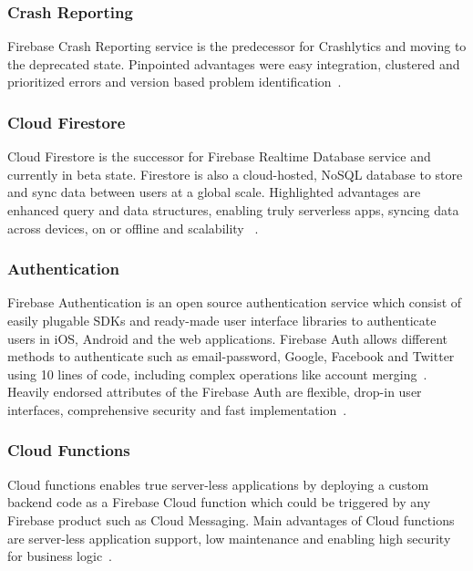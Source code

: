\subsubsection{Crash Reporting} Firebase Crash Reporting service is the
predecessor for Crashlytics and moving to the deprecated state. Pinpointed
advantages were easy integration, clustered and prioritized errors and version
based problem identification~\cite{hid-sp18-409-www-firebase-products}.

\subsubsection{Cloud Firestore} Cloud Firestore is the successor for Firebase
Realtime Database service and currently in beta state. Firestore is also a
cloud-hosted, NoSQL database to store and sync data between users at a global
scale. Highlighted advantages are enhanced query and data structures, enabling
truly serverless apps,  syncing data across devices, on or offline and
scalability ~\cite{hid-sp18-409-www-firebase-official,
	hid-sp18-409-www-firebase-products}.

\subsubsection{Authentication} Firebase Authentication is an open source
authentication service which consist of easily plugable SDKs and ready-made user
interface libraries to authenticate users in iOS, Android and the web
applications. Firebase Auth allows different methods to authenticate such as
email-password, Google, Facebook and Twitter using 10 lines of code, including
complex operations like account
merging~\cite{hid-sp18-409-www-firebase-products}. Heavily endorsed attributes
of the Firebase Auth are flexible, drop-in user interfaces, comprehensive
security and fast implementation~\cite{hid-sp18-409-www-firebase-wikipedia}.

\subsubsection{Cloud Functions} Cloud functions enables true server-less
applications by deploying a custom backend code as a Firebase Cloud function
which could be triggered by any Firebase product such as Cloud Messaging. Main
advantages of Cloud functions are server-less application support, low
maintenance and enabling high security for business
logic~\cite{hid-sp18-409-www-firebase-products}.

